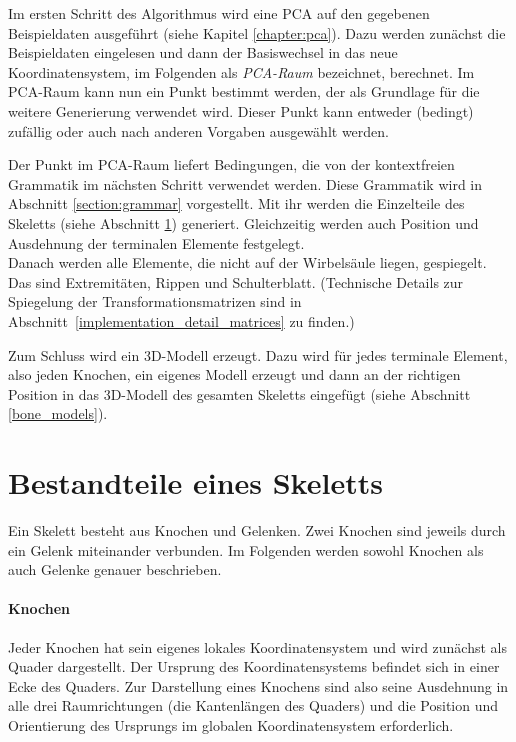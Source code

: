 Im ersten Schritt des Algorithmus wird eine PCA auf den gegebenen Beispieldaten ausgeführt (siehe Kapitel \ref{chapter:pca}). Dazu werden zunächst die Beispieldaten eingelesen und dann der Basiswechsel in das neue Koordinatensystem, im Folgenden als \emph{PCA-Raum} bezeichnet, berechnet. Im PCA-Raum kann nun ein Punkt bestimmt werden, der als Grundlage für die weitere Generierung verwendet wird. Dieser Punkt kann entweder (bedingt) zufällig oder auch nach anderen Vorgaben ausgewählt werden. 

Der Punkt im PCA-Raum liefert Bedingungen, die von der kontextfreien Grammatik im nächsten Schritt verwendet werden. Diese Grammatik wird in Abschnitt \ref{section:grammar} vorgestellt. Mit ihr werden die Einzelteile des Skeletts (siehe Abschnitt \ref{skeleton_parts}) generiert. Gleichzeitig werden auch Position und Ausdehnung der terminalen Elemente festgelegt.\\
Danach werden alle Elemente, die nicht auf der Wirbelsäule liegen, gespiegelt. Das sind Extremitäten, Rippen und Schulterblatt. (Technische Details zur Spiegelung der Transformationsmatrizen sind in \mbox{Abschnitt \ref{implementation_detail_matrices}} zu finden.)

Zum Schluss wird ein 3D-Modell erzeugt. Dazu wird für jedes terminale Element, also jeden Knochen, ein eigenes Modell erzeugt und dann an der richtigen Position in das 3D-Modell des gesamten Skeletts eingefügt (siehe Abschnitt \ref{bone_models}). 


\section{Bestandteile eines Skeletts}
\label{skeleton_parts}

Ein Skelett besteht aus Knochen und Gelenken. Zwei Knochen sind jeweils durch ein Gelenk miteinander verbunden. Im Folgenden werden sowohl Knochen als auch Gelenke genauer beschrieben.

\paragraph{Knochen}
Jeder Knochen hat sein eigenes lokales Koordinatensystem und wird zunächst als Quader dargestellt. Der Ursprung des Koordinatensystems befindet sich in einer Ecke des Quaders.
Zur Darstellung eines Knochens sind also
seine Ausdehnung in alle drei Raumrichtungen (die Kantenlängen des Quaders) und die Position und Orientierung des Ursprungs im globalen Koordinatensystem erforderlich.

